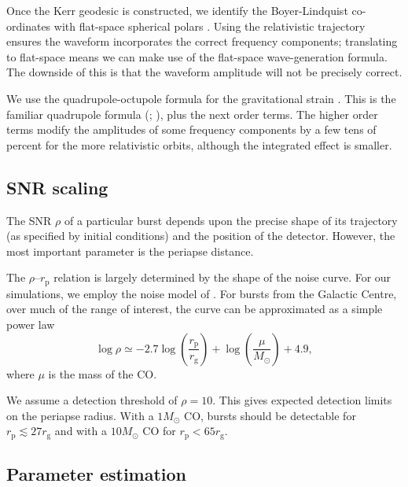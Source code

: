 \documentclass[useAMS,usedcolumn,usegraphicx,usenatbib]{mn2e}
\newcommand{\sub}[1]{\ensuremath{_\mathrm{#1}}}
\begin{document}
Once the Kerr geodesic is constructed, we identify the Boyer-Lindquist co-ordinates with flat-space spherical polars \citep{Gair2005, Babak2007}. Using the relativistic trajectory ensures the waveform incorporates the correct frequency components; translating to flat-space means we can make use of the flat-space wave-generation formula. The downside of this is that the waveform amplitude will not be precisely correct.

We use the quadrupole-octupole formula for the gravitational strain \citep{Bekenstein1973, Press1977, Yunes2008}. This is the familiar quadrupole formula (\citealt*[section 36.10]{Misner1973}; \citealt[section 17.9]{Hobson2006}), plus the next order terms. The higher order terms modify the amplitudes of some frequency components by a few tens of percent for the more relativistic orbits, although the integrated effect is smaller.

\subsection{SNR scaling}\label{sec:SNR}

The SNR $\rho$ of a particular burst depends upon the precise shape of its trajectory (as specified by initial conditions) and the position of the detector. However, the most important parameter is the periapse distance.

The $\rho$--$r\sub{p}$ relation is largely determined by the shape of the noise curve. For our simulations, we employ the noise model of \citet{Barack2004}. For bursts from the Galactic Centre, over much of the range of interest, the curve can be approximated as a simple power law \citep{Berry2013}
\begin{equation}
\log\rho \simeq -2.7\log\left(\frac{r\sub{p}}{r\sub{g}}\right) + \log\left(\frac{\mu}{M_\odot}\right) + 4.9,
\label{eq:SNR-power-law}
\end{equation}
where $\mu$ is the mass of the CO.

We assume a detection threshold of $\rho = 10$. This gives expected detection limits on the periapse radius. With a $1 M_\odot$ CO, bursts should be detectable for $r\sub{p} \lesssim 27 r\sub{g}$ and with a $10 M_\odot$ CO for $r\sub{p} < 65 r\sub{g}$.

\subsection{Parameter estimation}\label{sec:param-est-MCMC}
\end{document}
